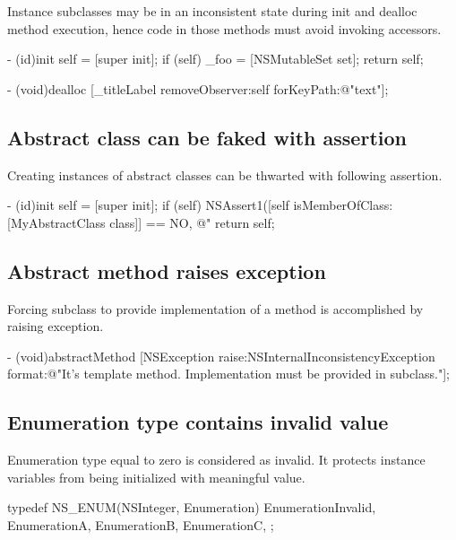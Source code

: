 \documentclass[10pt]{extarticle}
\newenvironment{codelisting}
{\footnotesize\mdframed[middlelinewidth=0.5pt, middlelinecolor=BaliHaiColor, skipabove=15pt]\verbatim}
{\endverbatim\endmdframed\vspace{12pt}\normalsize}
\begin{document}
Instance subclasses may be in an inconsistent state during init and dealloc method execution, hence code in those methods must avoid invoking accessors.

\begin{codelisting}
- (id)init
{
    self = [super init];
    if (self) {
        _foo = [NSMutableSet set];
    }
    return self;
}

- (void)dealloc
{
    [_titleLabel removeObserver:self forKeyPath:@"text"];
}
\end{codelisting}


\subsection{Abstract class can be faked with assertion}

Creating instances of abstract classes can be thwarted with following assertion.

\begin{codelisting}
- (id)init
{
    self = [super init];
    if (self) {
        NSAssert1([self isMemberOfClass:[MyAbstractClass class]] == NO,
                  @"%
    }
    return self;
}
\end{codelisting}


\subsection{Abstract method raises exception}

Forcing subclass to provide implementation of a method is accomplished by raising exception.

\begin{codelisting}
- (void)abstractMethod
{
    [NSException raise:NSInternalInconsistencyException 
                format:@"It's template method. Implementation must be provided in subclass."];
}
\end{codelisting}


\subsection{Enumeration type contains invalid value}

Enumeration type equal to zero is considered as invalid. It protects instance variables from being initialized with meaningful value.

\begin{codelisting}
typedef NS_ENUM(NSInteger, Enumeration) {
    EnumerationInvalid,
    EnumerationA,
    EnumerationB,
    EnumerationC,
};
\end{codelisting}
\end{document}
